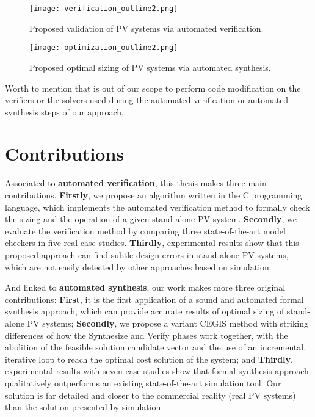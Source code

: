 \begin{figure}[h]
\texttt{[image: verification\_outline2.png]}
\centering
\caption{Proposed validation of PV systems via automated verification.}
\label{fig:validation_outline} 
\end{figure}


\begin{figure}[h]
\texttt{[image: optimization\_outline2.png]}
\centering
\caption{Proposed optimal sizing of PV systems via automated synthesis.}
\label{fig:optimization_outline} 
\end{figure}

Worth to mention that is out of our scope to perform code modification on the verifiers or the solvers used during the automated verification or automated synthesis steps of our approach. 

\section{Contributions}

Associated to \textbf{automated verification}, this thesis makes three main contributions. %
\textbf{Firstly}, we propose an algorithm written in the C programming language, which implements the automated verification method to formally check the sizing and the operation of a given stand-alone PV system. 
\textbf{Secondly}, we evaluate the verification method by comparing three state-of-the-art model checkers in five real case studies. 
\textbf{Thirdly}, experimental results show that this proposed approach can find subtle design errors in stand-alone PV systems, which are not easily detected by other approaches based on simulation. 
%

And linked to \textbf{automated synthesis}, our work makes more three original contributions: \textbf{First}, it is the first application of a sound and automated formal synthesis approach, which can provide accurate results of optimal sizing of stand-alone PV systems; 
\textbf{Secondly}, we propose a variant CEGIS method with striking differences of how the {\sc Synthesize} and {\sc Verify} phases work together, with the abolition of the feasible solution candidate vector and the use of an incremental, iterative loop to reach the optimal cost solution of the system; and 
\textbf{Thirdly}, experimental results with seven case studies show that formal synthesis approach qualitatively outperforms an existing state-of-the-art simulation tool. Our solution is far detailed and closer to the commercial reality (real PV systems) than the solution presented by simulation.

